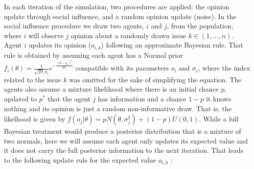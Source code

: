 \documentclass{article}
\begin{document}


In each iteration of the simulation, two procedures are applied: the
opinion update through social influence, and a random opinion update (noise). In
the social influence procedure we draw two agents, \(i\) and \(j\), from the
population, where \(i\) will observe \(j\) opinion about a randomly drawn issue \(k
\in (1 , \ldots, n)\). %
Agent \(i\)
updates its opinion (\(o_{i,k}\)) following an approximate Bayesian rule. That rule is obtained by assuming each agent has a
Normal prior \(f_i(\theta) = \frac{1}{\sqrt{2 \pi} \sigma_i} e^{- \frac{(\theta
- o_i )^2}{2 \sigma_i}} \) compatible with its parameters $o_{i}$ and $\sigma_{i}$, where the index related to the issue $k$ was omitted for the sake of simplifying the equation.  The agents also assume a mixture likelihood where there is an initial chance
\(p\), updated to \(p^*\) that the agent \(j\) has information and a chance
\(1-p\) it knows nothing and its opinion is just a random non-informative draw. That is, the likelhood is given by
 \( f(o_j|\theta) = p N(\theta,\sigma_j^2) + (1-p)U(0,1) \). While a full Bayesian treatment would produce a posterior distribution that is a mixture of two normals, here we will assume each agent only updates its expected value and it does not carry the full posterior information to the next iteration. That leads to the following update rule for the expected value $o_{i,k}$ \cite{martins12b}:
\end{document}

